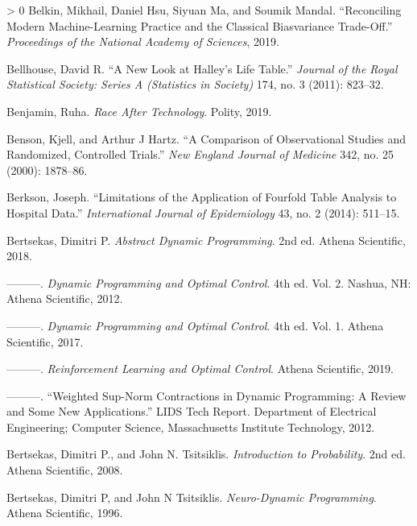 \documentclass{tufte-book}
\newlength{\cslhangindent}
\newenvironment{CSLReferences}[3] %
 {%
  \setlength{\parindent}{0pt}
  \ifodd #1 \everypar{\setlength{\hangindent}{\cslhangindent}}\ignorespaces\fi
  \ifnum #2 > 0
  \setlength{\parskip}{#3\baselineskip}
  \fi
 }%
 {
 }
\begin{document}
\begin{CSLReferences}{1}{0}
\leavevmode\hypertarget{ref-belkin2019reconciling}{}%
Belkin, Mikhail, Daniel Hsu, Siyuan Ma, and Soumik Mandal.
{``Reconciling Modern Machine-Learning Practice and the Classical
Bias{{}}variance Trade-Off.''} \emph{Proceedings of the National Academy
of Sciences}, 2019.

\leavevmode\hypertarget{ref-bellhouse2011new}{}%
Bellhouse, David R. {``A New Look at Halley's Life Table.''}
\emph{Journal of the Royal Statistical Society: Series A (Statistics in
Society)} 174, no. 3 (2011): 823--32.

\leavevmode\hypertarget{ref-benjamin2019race}{}%
Benjamin, Ruha. \emph{Race After Technology}. Polity, 2019.

\leavevmode\hypertarget{ref-benson2000comparison}{}%
Benson, Kjell, and Arthur J Hartz. {``A Comparison of Observational
Studies and Randomized, Controlled Trials.''} \emph{New England Journal
of Medicine} 342, no. 25 (2000): 1878--86.

\leavevmode\hypertarget{ref-berkson2014limitations}{}%
Berkson, Joseph. {``Limitations of the Application of Fourfold Table
Analysis to Hospital Data.''} \emph{International Journal of
Epidemiology} 43, no. 2 (2014): 511--15.

\leavevmode\hypertarget{ref-BertsekasAbstractDPBook}{}%
Bertsekas, Dimitri P. \emph{Abstract Dynamic Programming}. 2nd ed.
Athena Scientific, 2018.

\leavevmode\hypertarget{ref-BertsekasDPBook2}{}%
---------. \emph{Dynamic Programming and Optimal Control}. 4th ed. Vol.
2. Nashua, NH: Athena Scientific, 2012.

\leavevmode\hypertarget{ref-BertsekasDPBook}{}%
---------. \emph{Dynamic Programming and Optimal Control}. 4th ed. Vol.
1. Athena Scientific, 2017.

\leavevmode\hypertarget{ref-BertsekasRLBook}{}%
---------. \emph{Reinforcement Learning and Optimal Control}. Athena
Scientific, 2019.

\leavevmode\hypertarget{ref-Bertsekas2012}{}%
---------. {``Weighted Sup-Norm Contractions in Dynamic Programming: A
Review and Some New Applications.''} LIDS Tech Report. Department of
Electrical Engineering; Computer Science, Massachusetts Institute
Technology, 2012.

\leavevmode\hypertarget{ref-bt-probability-book}{}%
Bertsekas, Dimitri P., and John N. Tsitsiklis. \emph{Introduction to
Probability}. 2nd ed. Athena Scientific, 2008.

\leavevmode\hypertarget{ref-bertsekas1996neuro}{}%
Bertsekas, Dimitri P, and John N Tsitsiklis. \emph{Neuro-Dynamic
Programming}. Athena Scientific, 1996.


\end{CSLReferences}
\end{document}
